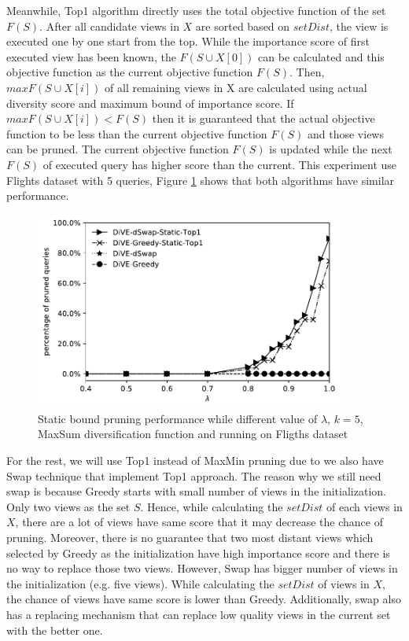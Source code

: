 \documentclass{article}
\begin{document}
Meanwhile, Top1 algorithm directly uses the total objective function of the set $ F(S) $. After all candidate views in $ X $ are sorted based on $ setDist $, the view is executed one by one start from the top. While the importance score of first executed view has been known, the $ F(S \cup X[0]) $ can be calculated and this objective function as the current objective function $ F(S) $. Then, $ maxF(S \cup X[i]) $ of all remaining views in X are calculated using actual diversity score and maximum bound of importance score. If $ maxF(S \cup X[i]) < F(S) $ then it is guaranteed that the actual objective function to be less than the current objective function $ F(S) $ and those views can be pruned. The current objective function $  F(S) $ is updated while the next $ F(S) $ of executed query has higher score than the current.
This experiment use Flights dataset with 5 queries, Figure \ref{fig:static-pruning} shows that both algorithms have similar performance.
\begin{figure}
	\begin{center}
		\includegraphics[width=4.0in]{figures/no_pruning_vs_static_extend}
		\vspace{-12pt}
		\caption{Static bound pruning performance while different value of $\lambda$, $k = 5$, MaxSum diversification function and running on Fligths dataset}
		\label{fig:static-pruning}
		\vspace{-20pt}
	\end{center}
\end{figure}

For the rest, we will use Top1 instead of MaxMin pruning due to we also have Swap technique that implement Top1 approach. The reason why we still need swap is because Greedy starts with small number of views in the initialization. Only two views as the set $ S $. Hence, while calculating the $ setDist $ of each views in $ X $, there are a lot of views have same score that it may decrease the chance of pruning. Moreover, there is no guarantee that two most distant views which selected by Greedy as the initialization have high importance score and there is no way to replace those two views. However, Swap has bigger number of views in the initialization (e.g. five views). While calculating the $ setDist $ of views in $ X $, the chance of views have same score is lower than Greedy. Additionally, swap also has a replacing mechanism that can replace low quality views in the current set with the better one. 
\end{document}
